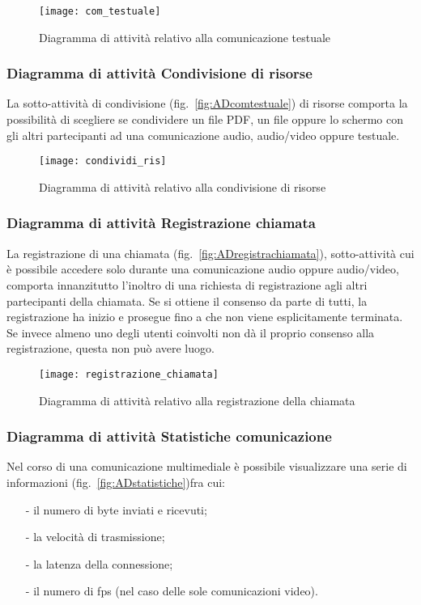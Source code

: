 \begin{figure}[H]
\centering
\texttt{[image: com\_testuale]}
\caption{Diagramma di attività relativo alla comunicazione testuale}\label{fig:ADcomtestuale}
\end{figure}

\subsubsection{Diagramma di attività Condivisione di risorse}
La sotto-attività di condivisione (fig.~\vref{fig:ADcomtestuale}) di risorse comporta la possibilità di scegliere se condividere un file PDF, un file oppure lo schermo con gli altri partecipanti ad una comunicazione audio, audio/video oppure testuale.

\begin{figure}[H]
\centering
\texttt{[image: condividi\_ris]}
\caption{Diagramma di attività relativo alla condivisione di risorse}\label{fig:ADcondrisorse}
\end{figure}

\subsubsection{Diagramma di attività Registrazione chiamata}
La registrazione di una chiamata (fig.~\vref{fig:ADregistrachiamata}), sotto-attività cui è possibile accedere solo durante una comunicazione audio oppure audio/video, comporta innanzitutto l'inoltro di una richiesta di registrazione agli altri partecipanti della chiamata. Se si ottiene il consenso da parte di tutti, la registrazione ha inizio e prosegue fino a che non viene esplicitamente terminata. Se invece almeno uno degli utenti coinvolti non dà il proprio consenso alla registrazione, questa non può avere luogo.

\begin{figure}[H]
\centering
\texttt{[image: registrazione\_chiamata]}
\caption{Diagramma di attività relativo alla registrazione della chiamata}\label{fig:ADregistrachiamata}
\end{figure}

\subsubsection{Diagramma di attività Statistiche comunicazione}
Nel corso di una comunicazione multimediale è possibile visualizzare una serie di informazioni (fig.~\vref{fig:ADstatistiche})fra cui:
\begin{itemize}[noitemsep,nolistsep]
  \item[-] il numero di byte inviati e ricevuti;
  \item[-] la velocità di trasmissione;
  \item[-] la latenza della connessione;
  \item[-] il numero di fps (nel caso delle sole comunicazioni video).
\end{itemize}

